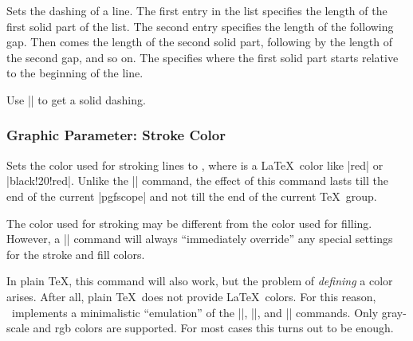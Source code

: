 \begin{command}{\pgfsetdash{}}
    Sets the dashing of a line. The first entry in the list specifies the
    length of the first solid part of the list. The second entry specifies the
    length of the following gap. Then comes the length of the second solid
    part, following by the length of the second gap, and so on. The
     specifies where the first solid part starts relative to the
    beginning of the line.
\begin{codeexample}[]
\begin{pgfpicture}
  \pgfsetdash{{0.5cm}{0.5cm}{0.1cm}{0.2cm}}{0cm}
  \pgfpathmoveto{\pgfpoint{0mm}{0mm}}
  \pgfpathlineto{\pgfpoint{2cm}{0mm}}
  \pgfsetdash{{0.5cm}{0.5cm}{0.1cm}{0.2cm}}{0.1cm}
  \pgfpathmoveto{\pgfpoint{0mm}{1mm}}
  \pgfpathlineto{\pgfpoint{2cm}{1mm}}
  \pgfsetdash{{0.5cm}{0.5cm}{0.1cm}{0.2cm}}{0.2cm}
  \pgfpathmoveto{\pgfpoint{0mm}{2mm}}
  \pgfpathlineto{\pgfpoint{2cm}{2mm}}
\end{pgfpicture}
\end{codeexample}

    Use |\pgfsetdash{}{0pt}| to get a solid dashing.
\end{command}


\subsubsection{Graphic Parameter: Stroke Color}

\begin{command}{\pgfsetstrokecolor{}}
    Sets the color used for stroking lines to , where 
    is a \LaTeX\ color like |red| or |black!20!red|. Unlike the |\color|
    command, the effect of this command lasts till the end of the current
    |{pgfscope}| and not till the end of the current \TeX\ group.

    The color used for stroking may be different from the color used for
    filling. However, a |\color| command will always ``immediately override''
    any special settings for the stroke and fill colors.

    In plain \TeX, this command will also work, but the problem of
    \emph{defining} a color arises. After all, plain \TeX\ does not provide
    \LaTeX\ colors. For this reason, \pgfname\ implements a minimalistic
    ``emulation'' of the |\definecolor|, ||, and |\color| commands.
    Only gray-scale and rgb colors are supported. For most cases this turns out
    to be enough.
\begin{codeexample}[]
\begin{pgfpicture}
  \pgfsetlinewidth{1pt}
  \color{red}
  \pgfpathcircle{\pgfpoint{0cm}{0cm}}{3mm} 
  \pgfpathcircle{\pgfpoint{1cm}{0cm}}{3mm} 
  \color{red}
  \pgfpathcircle{\pgfpoint{2cm}{0cm}}{3mm} 
\end{pgfpicture}
\end{codeexample}
\end{command}

